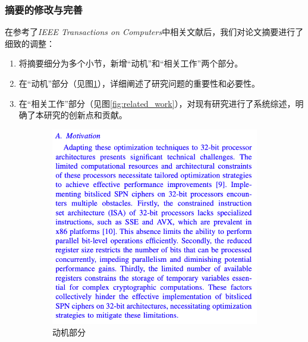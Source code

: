 \documentclass{beamer}
\begin{document}
\begin{frame}
    \frametitle{摘要的修改与完善}
    在参考了\textit{IEEE Transactions on Computers}中相关文献\cite{Liu2020}后，我们对论文摘要进行了细致的调整：
    \begin{enumerate}
        \item 将摘要细分为多个小节，新增“动机”和“相关工作”两个部分。
        \item 在“动机”部分（见图\ref{fig:motivation}），详细阐述了研究问题的重要性和必要性。
        \item 在“相关工作”部分（见图\ref{fig:related_work}），对现有研究进行了系统综述，明确了本研究的创新点和贡献。
    \end{enumerate}
    \begin{figure}[h]
      \centering
      \begin{subfigure}[b]{0.3\textwidth}
        \includegraphics[width=\textwidth]{./fig/motivation.png}
        \caption{动机部分}
        \label{fig:motivation}
      \end{subfigure}
      \hfill
      \begin{subfigure}[b]{0.3\textwidth}

\end{subfigure}
\end{figure}
\end{frame}
\end{document}
